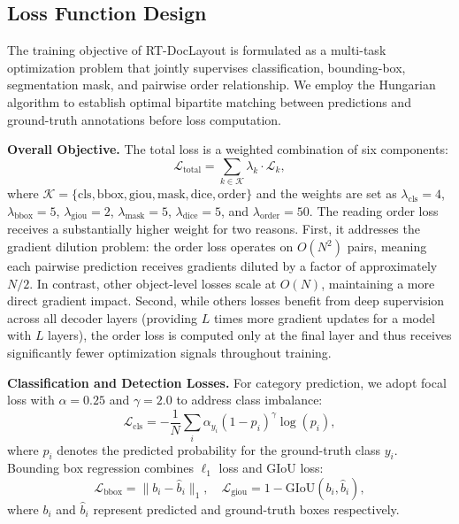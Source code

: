 \documentclass[11pt, a4paper,logo,  copyright, nonumbering]{paddleocr}
\begin{document}
\subsection{Loss Function Design}
\label{subsec:loss_function_design}

The training objective of RT-DocLayout is formulated as a multi-task optimization problem that jointly supervises classification, bounding-box, segmentation mask, and pairwise order relationship. We employ the Hungarian algorithm to establish optimal bipartite matching between predictions and ground-truth annotations before loss computation.

\textbf{Overall Objective.}
The total loss is a weighted combination of six components:
\begin{equation}
    \mathcal{L}_{\text{total}} = \sum_{k \in \mathcal{K}} \lambda_k \cdot \mathcal{L}_k,
\end{equation}
where $\mathcal{K} = \{\text{cls}, \text{bbox}, \text{giou}, \text{mask}, \text{dice}, \text{order}\}$ and the weights are set as $\lambda_{\text{cls}}=4$, $\lambda_{\text{bbox}}=5$, $\lambda_{\text{giou}}=2$, $\lambda_{\text{mask}}=5$, $\lambda_{\text{dice}}=5$, and $\lambda_{\text{order}}=50$. The reading order loss receives a substantially higher weight for two reasons. First, it addresses the gradient dilution problem: the order loss operates on $O(N^2)$ pairs, meaning each pairwise prediction receives gradients diluted by a factor of approximately $N/2$. In contrast, other object-level losses scale at $O(N)$, maintaining a more direct gradient impact. Second, while others losses benefit from deep supervision across all decoder layers (providing $L$ times more gradient updates for a model with $L$ layers), the order loss is computed only at the final layer and thus receives significantly fewer optimization signals throughout training.

\textbf{Classification and Detection Losses.}
For category prediction, we adopt focal loss with $\alpha=0.25$ and $\gamma=2.0$ to address class imbalance:
\begin{equation}
    \mathcal{L}_{\text{cls}} = -\frac{1}{N} \sum_{i} \alpha_{y_i} (1 - p_i)^{\gamma} \log(p_i),
\end{equation}
where $p_i$ denotes the predicted probability for the ground-truth class $y_i$. Bounding box regression combines $\ell_1$ loss and GIoU loss:
\begin{equation}
    \mathcal{L}_{\text{bbox}} = \|b_i - \hat{b}_i\|_1, \quad
    \mathcal{L}_{\text{giou}} = 1 - \text{GIoU}(b_i, \hat{b}_i),
\end{equation}
where $b_i$ and $\hat{b}_i$ represent predicted and ground-truth boxes respectively.
\end{document}
